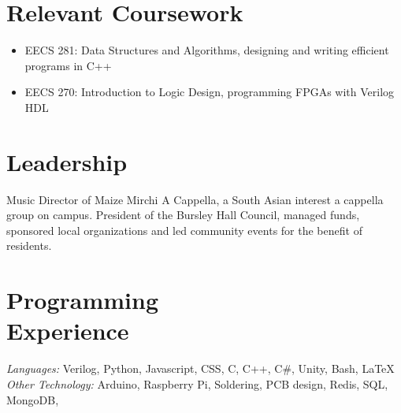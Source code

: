 \documentclass[margin,line]{resume}
\begin{document}
\begin{resume}
   \section{\mysidestyle Relevant Coursework}
   \begin{itemize}
   	\item EECS 281: Data Structures and Algorithms, designing and writing efficient programs in C++
   	\item EECS 270: Introduction to Logic Design, programming FPGAs with Verilog HDL
   \end{itemize}
	


   \section{\mysidestyle Leadership}
    Music Director of Maize Mirchi A Cappella, a South Asian interest a cappella group on campus. President of the Bursley Hall Council, managed funds, sponsored local organizations and led community events for the benefit of residents. 
\vspace{-2mm}

    \section{\mysidestyle Programming\\Experience}

    \emph{Languages:} Verilog, Python, Javascript, CSS, C,  C++, C\#, Unity, Bash, \LaTeX \\
    \emph{Other Technology:}  Arduino, Raspberry Pi, Soldering, PCB design, Redis, SQL, MongoDB,
\end{resume}
\end{document}
